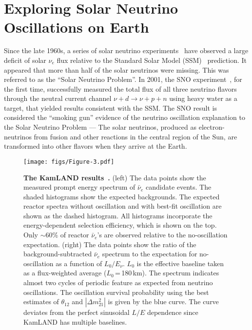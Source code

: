 \documentclass[aps,twocolumn,preprintnumbers,amsmath,superscriptaddress,amssymb,floats,nofootinbib]{revtex4-1}
\begin{document}
\newpage


\twocolumngrid


\section{Exploring Solar Neutrino Oscillations on Earth} 
\label{sec:kamland}

Since the late 1960s, a series of solar neutrino experiments~\cite{Homestake,GALLEX,SAGE,Kamiokande,Super-Kamiokande} have observed a large deficit of solar $\nu_e$ flux relative to the Standard Solar Model (SSM)~\cite{Bahcall} prediction. 
It appeared that more than half of the solar neutrinos were missing. 
This was referred to as the ``Solar Neutrino Problem''. 
In 2001, the SNO experiment~\cite{SNO}, for the first time, successfully measured the total flux of all three neutrino flavors through the neutral current channel $\nu + d \to \nu + p + n$ using heavy water as a target, that yielded 
results consistent with the SSM. 
The SNO result is considered the ``smoking gun'' evidence of the neutrino oscillation explanation to the Solar Neutrino Problem --- The solar neutrinos, produced as electron-neutrinos from fusion and other reactions in the central region of the Sun, are transformed into other flavors when they arrive at the Earth.

\begin{figure*}[htb]
  \centering
  \texttt{[image: figs/Figure-3.pdf]}
  \caption{ \label{fig:kamland}{\bf The KamLAND results~\cite{Kamland08}.} (left) The data points show the measured prompt energy spectrum of $\bar\nu_e$ candidate events. The shaded histograms show the expected backgrounds. The expected reactor spectra without oscillation and with best-fit oscillation are shown as the dashed histogram. All histograms incorporate the energy-dependent selection efficiency, which is shown on the top. Only $\sim$60\% of reactor $\bar\nu_e$'s are observed relative to the no-oscillation expectation. 
  (right) The data points show the ratio of the background-subtracted
  $\bar\nu_e$ spectrum to the expectation for no-oscillation as a
  function of $L_{0}/E_{\nu}$. $L_{0}$ is the effective baseline taken as a
  flux-weighted average ($L_{0}$\,=\,180\,km). 
  The spectrum indicates almost two cycles of periodic feature as expected from neutrino oscillations. The oscillation survival probability using the best estimates of $\theta_{12}$ and $|\Delta{m}^2_{21}|$ is given by the blue curve. 
  The curve deviates from the perfect sinusoidal $L/E$ dependence since KamLAND has multiple baselines.
  }
\end{figure*}
\end{document}
